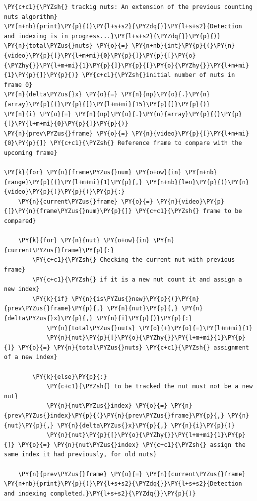 \documentclass[a4paper,11pt]{article}%
\begin{document}
    \begin{tcolorbox}[breakable, size=fbox, boxrule=1pt, pad at break*=1mm,colback=cellbackground, colframe=cellborder]
\begin{Verbatim}[commandchars=\\\{\}]
\PY{c+c1}{\PYZsh{} trackig nuts: An extension of the previous counting nuts algorithm}
\PY{n+nb}{print}\PY{p}{(}\PY{l+s+s2}{\PYZdq{}}\PY{l+s+s2}{Detection and indexing is in progress...}\PY{l+s+s2}{\PYZdq{}}\PY{p}{)}
\PY{n}{total\PYZus{}nuts} \PY{o}{=} \PY{n+nb}{int}\PY{p}{(}\PY{n}{video}\PY{p}{[}\PY{l+m+mi}{0}\PY{p}{]}\PY{p}{[}\PY{o}{\PYZhy{}}\PY{l+m+mi}{1}\PY{p}{]}\PY{p}{[}\PY{o}{\PYZhy{}}\PY{l+m+mi}{1}\PY{p}{]}\PY{p}{)} \PY{c+c1}{\PYZsh{}initial number of nuts in frame 0}
\PY{n}{delta\PYZus{}x} \PY{o}{=} \PY{n}{np}\PY{o}{.}\PY{n}{array}\PY{p}{(}\PY{p}{[}\PY{l+m+mi}{15}\PY{p}{]}\PY{p}{)}
\PY{n}{i} \PY{o}{=} \PY{n}{np}\PY{o}{.}\PY{n}{array}\PY{p}{(}\PY{p}{[}\PY{l+m+mi}{0}\PY{p}{]}\PY{p}{)}
\PY{n}{prev\PYZus{}frame} \PY{o}{=} \PY{n}{video}\PY{p}{[}\PY{l+m+mi}{0}\PY{p}{]} \PY{c+c1}{\PYZsh{} Reference frame to compare with the upcoming frame}

\PY{k}{for} \PY{n}{frame\PYZus{}num} \PY{o+ow}{in} \PY{n+nb}{range}\PY{p}{(}\PY{l+m+mi}{1}\PY{p}{,} \PY{n+nb}{len}\PY{p}{(}\PY{n}{video}\PY{p}{)}\PY{p}{)}\PY{p}{:}
    \PY{n}{current\PYZus{}frame} \PY{o}{=} \PY{n}{video}\PY{p}{[}\PY{n}{frame\PYZus{}num}\PY{p}{]} \PY{c+c1}{\PYZsh{} frame to be compared}

    \PY{k}{for} \PY{n}{nut} \PY{o+ow}{in} \PY{n}{current\PYZus{}frame}\PY{p}{:}
        \PY{c+c1}{\PYZsh{} Checking the current nut with previous frame}
        \PY{c+c1}{\PYZsh{} if it is a new nut count it and assign a new index}
        \PY{k}{if} \PY{n}{is\PYZus{}new}\PY{p}{(}\PY{n}{prev\PYZus{}frame}\PY{p}{,} \PY{n}{nut}\PY{p}{,} \PY{n}{delta\PYZus{}x}\PY{p}{,} \PY{n}{i}\PY{p}{)}\PY{p}{:}
            \PY{n}{total\PYZus{}nuts} \PY{o}{+}\PY{o}{=}\PY{l+m+mi}{1}
            \PY{n}{nut}\PY{p}{[}\PY{o}{\PYZhy{}}\PY{l+m+mi}{1}\PY{p}{]} \PY{o}{=} \PY{n}{total\PYZus{}nuts} \PY{c+c1}{\PYZsh{} assignment of a new index}

        \PY{k}{else}\PY{p}{:}
            \PY{c+c1}{\PYZsh{} to be tracked the nut must not be a new nut}
            \PY{n}{nut\PYZus{}index} \PY{o}{=} \PY{n}{prev\PYZus{}index}\PY{p}{(}\PY{n}{prev\PYZus{}frame}\PY{p}{,} \PY{n}{nut}\PY{p}{,} \PY{n}{delta\PYZus{}x}\PY{p}{,} \PY{n}{i}\PY{p}{)}
            \PY{n}{nut}\PY{p}{[}\PY{o}{\PYZhy{}}\PY{l+m+mi}{1}\PY{p}{]} \PY{o}{=} \PY{n}{nut\PYZus{}index} \PY{c+c1}{\PYZsh{} assign the same index it had previously, for old nuts}

    \PY{n}{prev\PYZus{}frame} \PY{o}{=} \PY{n}{current\PYZus{}frame}
\PY{n+nb}{print}\PY{p}{(}\PY{l+s+s2}{\PYZdq{}}\PY{l+s+s2}{Detection and indexing completed.}\PY{l+s+s2}{\PYZdq{}}\PY{p}{)}
\end{Verbatim}
\end{tcolorbox}
\end{document}
